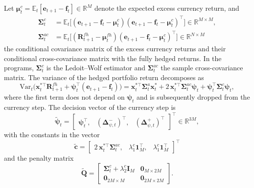 Let $\bm{\mu}^c_t = \mathbb{E}_t[\bm{e}_{t+1} - \bm{f}_t] \in \mathbb{R}^M$ denote the expected excess currency
return, and
\begin{equation*}
\begin{aligned}
    \bm{\Sigma}^c_t &= \mathbb{E}_t\bigl[ (\bm{e}_{t+1} - \bm{f}_t - \bm{\mu}^c_t)
    (\bm{e}_{t+1} - \bm{f}_t - \bm{\mu}^c_t)^\top \bigr] \in \mathbb{R}^{M \times M}, \\
    \bm{\Sigma}^{ac}_t &= \mathbb{E}_t\bigl[ (\bm{R}^{fh}_{t+1} - \bm{\mu}^{fh}_t)
    (\bm{e}_{t+1} - \bm{f}_t - \bm{\mu}^c_t)^\top \bigr] \in \mathbb{R}^{N \times M}
\end{aligned}
\end{equation*}
the conditional covariance matrix of the excess currency returns and their conditional cross-covariance matrix with
the fully hedged returns. In the programs, $\bm{\Sigma}^c_t$ is the Ledoit--Wolf estimator and $\bm{\Sigma}^{ac}_t$ the
sample cross-covariance matrix. The variance of the hedged portfolio return
decomposes as
\begin{equation*}
    \text{Var}_t\bigl( \bm{x}_t^{*\top} \bm{R}^{fh}_{t+1} + \bm{\psi}_t^\top (\bm{e}_{t+1} - \bm{f}_t) \bigr)
    = \bm{x}_t^{*\top} \bm{\Sigma}^a_t \bm{x}_t^*
    + 2\, \bm{x}_t^{*\top} \bm{\Sigma}^{ac}_t \bm{\psi}_t
    + \bm{\psi}_t^\top \bm{\Sigma}^c_t \bm{\psi}_t,
\end{equation*}
where the first term does not depend on $\bm{\psi}_t$ and is subsequently dropped from the currency step. The decision vector of
the currency step is
\begin{equation*}
    \tilde{\bm{\psi}}_t = \begin{bmatrix} \bm{\psi}_t^\top,& (\bm{\Delta}_{\psi,t}^-)^\top,& (\bm{\Delta}_{\psi,t}^+)^\top
    \end{bmatrix}^\top \in \mathbb{R}^{3M},
\end{equation*}
with the constants in the vector
\begin{equation*}
    \tilde{\bm{c}} = \begin{bmatrix} 2\, \bm{x}_t^{*\top} \bm{\Sigma}^{ac}_t,& \lambda_1^c \bm{1}_M^\top,&
    \lambda_1^c \bm{1}_M^\top \end{bmatrix}^\top
\end{equation*}
and the penalty matrix
\begin{equation*}
    \tilde{\bm{Q}} =
    \begin{bmatrix}
        \bm{\Sigma}^c_t + \lambda_2^c \bm{I}_M & \bm{0}_{M \times 2M} \\
        \bm{0}_{2M \times M} & \bm{0}_{2M \times 2M}
    \end{bmatrix}.
\end{equation*}
